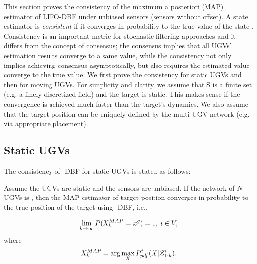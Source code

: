 	
	This section proves the consistency of the maximum a posteriori (MAP) estimator of LIFO-DBF under unbiased sensors (sensors without offset).
	A state estimator is \textit{consistent} if it converges in probability to the true value of the state \cite{amemiya1985advanced}.
	Consistency is an important metric for stochastic filtering approaches \cite{chen2003bayesian} and it differs from the concept of consensus; the consensus implies that all UGVs' estimation results converge to a same value, while the consistency not only implies achieving consensus asymptotically, but also requires the estimated value converge to the true value.	
	We first prove the consistency for static UGVs and then for moving UGVs. 
	For simplicity and clarity, we assume that S is a finite set (e.g. a finely discretized field) and the target is static.
	This makes sense if the convergence is achieved much faster than the target's dynamics.
	We also assume that the target position can be uniquely defined by the multi-UGV network (e.g. via appropriate placement).
	
	\subsection{Static UGVs}	
	The consistency of \proto-DBF for static UGVs is stated as follows: 
	
	\begin{thm}\label{thm:\proto-dbf-sta-ugv}
		Assume the UGVs are static and the sensors are unbiased. If the network of $N$ UGVs is \fc, then the MAP estimator of target position converges in probability to the true position of the target using \proto-DBF, i.e.,
		
		\small\begin{equation*}
		\lim\limits_{k\rightarrow \infty}
		P(X_k^{MAP}=x^g)=
		1,\;i\in V,
		\end{equation*}\normalsize
		where 
		\small\begin{equation*}
		X_k^{MAP}=\arg\max\limits_{X}P^i_{pdf}(X|\mathcal{Z}^{i}_{1:k}).
		\end{equation*}		
	\end{thm}
	
